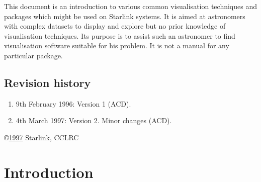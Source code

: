 
This document is an introduction to various common visualisation 
techniques and packages which might be used on Starlink systems. It is
aimed at astronomers with complex datasets to display and explore but
no prior knowledge of visualisation techniques. Its purpose is to
assist such an astronomer to find visualisation software suitable for his
problem. It is not a manual for any particular package.
 \begin{latex}
   \newpage
   \setlength{\parskip}{0mm}
   \latexonlytoc

   \newpage
   \listoftables
   \listoffigures

   \setlength{\parskip}{\medskipamount}
   \markboth{\stardocname}{\stardocname}
 \end{latex}

\newpage
\subsection*{Revision history}

\begin{enumerate}

  \item 9th February 1996: Version 1 (ACD).

  \item 4th March 1997: Version 2.  Minor changes (ACD).

\end{enumerate}

\vspace{5cm}
\copyright \underline{1997} Starlink, CCLRC


\cleardoublepage
\renewcommand{\thepage}{\arabic{page}}
\setcounter{page}{1}



\section{Introduction  }

